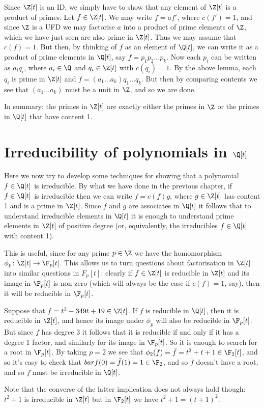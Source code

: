 \documentclass{maths}
\begin{document}
\begin{prf}
    Since $\Z[t]$ is an ID, we simply have to show that any element of $\Z[t]$ is a product of primes.
    Let $f\in\Z[t]$.
    We may write $f=af'$, where $c(f')=1$, and since $\Z$ is a UFD we may factorise $a$ into a product of prime elements of $\Z$, which we have just seen are also prime in $\Z[t]$.
    Thus we may assume that $c(f)=1$.
    But then, by thinking of $f$ as an element of $\Q[t]$, we can write it as a product of prime elements in $\Q[t]$, say $f=p_1p_2\ldots p_k$.
    Now each $p_i$ can be written as $a_iq_i$, where $a_i\in\Q$ and $q_i\in\Z[t]$ with $c(q_i)=1$.
    By the above lemma, each $q_i$ is prime in $\Z[t]$ and $f=(a_1\ldots a_k)q_1\ldots q_k$.
    But then by comparing contents we see that $(a_1\ldots a_k)$ must be a unit in $\Z$, and so we are done.
\end{prf}

\begin{rem}
    In summary: the primes in $\Z[t]$ are exactly either the primes in $\Z$ or the primes in $\Q[t]$ that have content 1.
\end{rem}

\section{Irreducibility of polynomials in \texorpdfstring{$\Q[t]$}{Q[t]}}

Here we now try to develop some techniques for showing that a polynomial $f\in\Q[t]$ is irreducible.
By what we have done in the previous chapter, if $f\in\Q[t]$ is irreducible then we can write $f=c(f)g$, where $g\in\Z[t]$ has content 1 and is a prime in $\Z[t]$.
Since $f$ and $g$ are associates in $\Q[t]$ it follows that to understand irreducible elements in $\Q[t]$ it is enough to understand prime elements in $\Z[t]$ of positive degree (or, equivalently, the irreducibles $f\in\Q[t]$ with content 1).

This is useful, since for any prime $p\in\Z$ we have the homomorphism $\phi_p\colon\Z[t]\to\F_p[t]$.
This allows us to turn questions about factorisation in $\Z[t]$ into similar questions in $F_p[t]$: clearly if $f\in\Z[t]$ is reducible in $\Z[t]$ and its image in $\F_p[t]$ is non zero (which will always be the case if $c(f)=1$, say), then it will be reducible in $\F_p[t]$.

\begin{ex}
    Suppose that $f=t^3-349t+19\in\Z[t]$.
    If $f$ is reducible in $\Q[t]$, then it is reducible in $\Z[t]$, and hence its image under $\phi_p$ will also be reducible in $\F_p[t]$.
    But since $f$ has degree 3 it follows that it is reducible if and only if it has a degree 1 factor, and similarly for its image in $\F_p[t]$.
    So it is enough to search for a root in $\F_p[t]$.
    By taking $p=2$ we see that $\phi_2(f)=\bar{f}=t^3+t+1\in\F_2[t]$, and so it's easy to check that $bar{f}(0)=\bar{f}(1)=1\in\F_2$, and so $\bar{f}$ doesn't have a root, and so $f$ must be irreducible in $\Q[t]$.

    Note that the converse of the latter implication does not always hold though: $t^2+1$ is irreducible in $\Z[t]$ but in $\F_2[t]$ we have $t^2+1=(t+1)^2$.
\end{ex}
\end{document}
